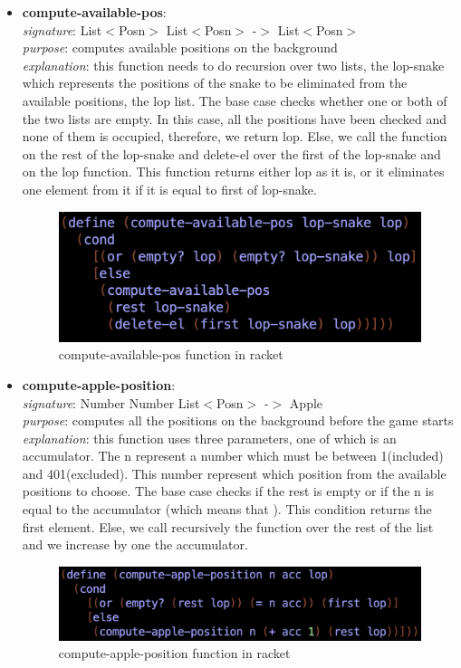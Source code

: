 \documentclass{article}
\begin{document}
\begin{itemize}
		\item \textbf{compute-available-pos}: \\
			\emph{signature}: List$<$Posn$>$ List$<$Posn$>$ -$>$ List$<$Posn$>$ \\
			\emph{purpose}: computes available positions on the background \\
			\emph{explanation}: this function needs to do recursion over two lists, the lop-snake which represents the positions of the snake 							to be eliminated from the available positions, the lop list. The base case checks whether one or both of the 							two lists are empty. In this case, all the positions have been checked and none of them is occupied, 									therefore, we return lop. Else, we call the function on the rest of the lop-snake and delete-el over the first of 							the lop-snake and on the lop function. This function returns either lop as it is, or it eliminates one element 								from it if it is equal to first of lop-snake. 
			\begin{figure}[h!]
				\centering
				\includegraphics[width=.6\linewidth]{compute-available-pos.png}
				\caption{compute-available-pos function in racket}
			\end{figure}
			
		\item \textbf{compute-apple-position}: \\
			\emph{signature}: Number Number List$<$Posn$>$ -$>$ Apple \\
			\emph{purpose}: computes all the positions on the background before the game starts \\
			\emph{explanation}: this function uses three parameters, one of which is an accumulator. The n represent a number which must be between 1(included) and 401(excluded). This number represent which position from the available positions to choose. The base case checks if the rest is empty or if the n is equal to the accumulator (which means that ). This condition returns the first element. Else, we call recursively the function over the rest of the list and we increase by one the accumulator. 
			\begin{figure}[h!]
				\centering
				\includegraphics[width=.6\linewidth]{compute-apple-position.png}
				\caption{compute-apple-position function in racket}
			\end{figure}
			

\end{itemize}
\end{document}
